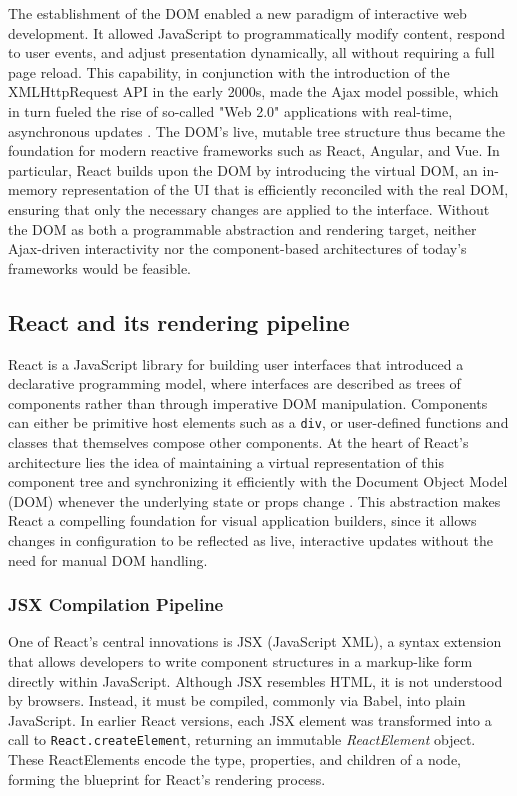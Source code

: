 \documentclass[oneside,12pt]{book}
\begin{document}
The establishment of the DOM enabled a new paradigm of interactive web development. It allowed JavaScript to programmatically modify content, respond to user events, and adjust presentation dynamically, all without requiring a full page reload. This capability, in conjunction with the introduction of the XMLHttpRequest API in the early 2000s, made the Ajax model possible, which in turn fueled the rise of so-called "Web 2.0" applications with real-time, asynchronous updates \cite{garrett2005ajax}. The DOM's live, mutable tree structure thus became the foundation for modern reactive frameworks such as React, Angular, and Vue. In particular, React builds upon the DOM by introducing the virtual DOM, an in-memory representation of the UI that is efficiently reconciled with the real DOM, ensuring that only the necessary changes are applied to the interface. Without the DOM as both a programmable abstraction and rendering target, neither Ajax-driven interactivity nor the component-based architectures of today's frameworks would be feasible.

\subsection{React and its rendering pipeline}

React is a JavaScript library for building user interfaces that introduced a declarative programming model, where interfaces are described as trees of components rather than through imperative DOM manipulation. Components can either be primitive host elements such as a \texttt{div}, or user-defined functions and classes that themselves compose other components. At the heart of React’s architecture lies the idea of maintaining a virtual representation of this component tree and synchronizing it efficiently with the Document Object Model (DOM) whenever the underlying state or props change \cite{chavan2021jsx, reactdocs_virtualdom}. This abstraction makes React a compelling foundation for visual application builders, since it allows changes in configuration to be reflected as live, interactive updates without the need for manual DOM handling.

\subsubsection{JSX Compilation Pipeline}

One of React’s central innovations is JSX (JavaScript XML), a syntax extension that allows developers to write component structures in a markup-like form directly within JavaScript. Although JSX resembles HTML, it is not understood by browsers. Instead, it must be compiled, commonly via \gls{Babel}, into plain JavaScript. In earlier React versions, each JSX element was transformed into a call to \texttt{React.createElement}, returning an immutable \emph{ReactElement} object. These ReactElements encode the type, properties, and children of a node, forming the blueprint for React’s rendering process. \cite{reactdocs_jsx, react17_jsx_runtime}  
\end{document}
